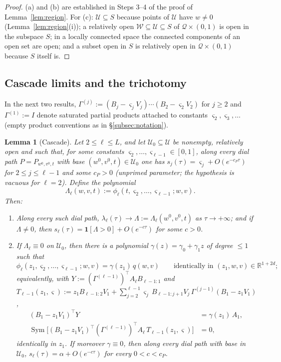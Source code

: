 \documentclass[11pt]{article}
\newtheorem{lemma}[theorem]{Lemma}
\theoremstyle{definition}
\theoremstyle{remark}
\theoremstyle{plain}
\newcommand{\R}{\mathbb{R}}
\newcommand{\cQ}{\mathcal{Q}}
\newcommand{\cU}{\mathcal{U}}
\newcommand{\cW}{\mathcal{W}}
\newcommand{\Sym}{\operatorname{Sym}}
\begin{document}
\begin{proof}
(a) and (b) are established in Steps 3--4 of the proof of Lemma~\ref{lem:region}.
For (c): $\cU\subseteq S$ because points of $\cU$ have $w\neq0$
(Lemma~\ref{lem:region}(i)); a relatively open $\cW\subseteq\cU\subseteq S$ of
$\cQ\times(0,1)$ is open in the subspace $S$; in a locally connected space the
connected components of an open set are open; and a subset open in $S$ is relatively
open in $\cQ\times(0,1)$ because $S$ itself is.
\end{proof}

\subsection{Cascade limits and the trichotomy}

In the next two results, $\Gamma^{(j)}:=(B_j-\varsigma_jV_j)\cdots(B_2-\varsigma_2V_2)$
for $j\ge2$ and $\Gamma^{(1)}:=I$ denote saturated partial products attached to
constants $\varsigma_2,\varsigma_3,\dots$ (empty product conventions as in
\S\ref{subsec:notation}).

\begin{lemma}[Cascade]\label{lem:cascade}
Let $2\le\ell\le L$, and let $\cU_0\subseteq\cU$ be nonempty, relatively open and
such that, for some constants $\varsigma_2,\dots,\varsigma_{\ell-1}\in[0,1]$, along
every dial path $P=P_{w^0,v^0,t}$ with base $(w^0,v^0,t)\in\cU_0$ one has
$s_j(\tau)=\varsigma_j+O(e^{-c_P\tau})$ for $2\le j\le\ell-1$ and some $c_P>0$
(unprimed parameter; the hypothesis is vacuous for $\ell=2$).  Define the polynomial
\[
\Lambda_\ell(w,v,t):=\phi_\ell(t,\varsigma_2,\dots,\varsigma_{\ell-1};w,v).
\]
Then:
\begin{enumerate}
\item[(a)] Along every such dial path,
$\lambda_\ell(\tau)\to\Lambda:=\Lambda_\ell(w^0,v^0,t)$ as $\tau\to+\infty$; and if
$\Lambda\neq0$, then $s_\ell(\tau)=\mathbf 1[\Lambda>0]+O(e^{-c\tau})$ for some $c>0$.
\item[(b)] If $\Lambda_\ell\equiv0$ on $\cU_0$, then there is a polynomial
$\gamma(z)=\gamma_0+\gamma_1z$ of degree $\le1$ such that
\begin{equation}\label{eq:curve}
\phi_\ell(z_1,\varsigma_2,\dots,\varsigma_{\ell-1};w,v)
=\gamma(z_1)\,q(w,v)
\qquad\text{identically in }(z_1,w,v)\in\R^{1+2d};
\end{equation}
equivalently, with $Y:=(\Gamma^{(\ell-1)})^\top A_\ell B_{\ell-1:1}$ and
$T_{\ell-1}(z_1,\varsigma)
:=z_1B_{\ell-1:2}V_1+\sum_{j=2}^{\ell-1}\varsigma_j\,
B_{\ell-1:j+1}V_j\,\Gamma^{(j-1)}(B_1-z_1V_1)$,
\begin{align}
(B_1-z_1V_1)^\top Y&=\gamma(z_1)\,A_1,
\tag{$\heartsuit$}\label{eq:heart}\\
\Sym\Big[(B_1-z_1V_1)^\top(\Gamma^{(\ell-1)})^\top A_\ell\,
T_{\ell-1}(z_1,\varsigma)\Big]&=0,
\tag{$\clubsuit$}\label{eq:club}
\end{align}
identically in $z_1$.  If moreover $\gamma\equiv0$, then along every dial path with
base in $\cU_0$, $s_\ell(\tau)=\alpha+O(e^{-c\tau})$ for every $0<c<c_P$.
\end{enumerate}
\end{lemma}
\end{document}
